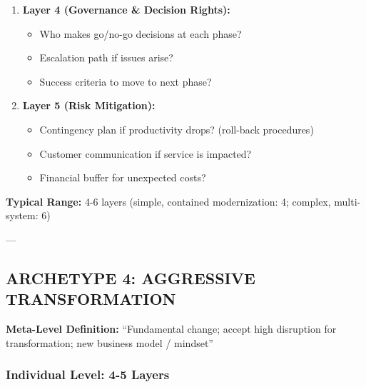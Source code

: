 \documentclass[11pt, a4paper]{article}
\begin{document}
\begin{tcolorbox}[colback=gray!5!white, colframe=gray!75!black, title=Example: Digital Modernization (Incremental Implementation)]
\begin{enumerate}
    \item \textbf{Layer 4 (Governance \& Decision Rights):}
    \begin{itemize}[nosep]
        \item Who makes go/no-go decisions at each phase?
        \item Escalation path if issues arise?
        \item Success criteria to move to next phase?
    \end{itemize}

    \item \textbf{Layer 5 (Risk Mitigation):}
    \begin{itemize}[nosep]
        \item Contingency plan if productivity drops? (roll-back procedures)
        \item Customer communication if service is impacted?
        \item Financial buffer for unexpected costs?
    \end{itemize}
\end{enumerate}

\textbf{Typical Range:} 4-6 layers (simple, contained modernization: 4; complex, multi-system: 6)

\end{tcolorbox}

---

\subsection{ARCHETYPE 4: AGGRESSIVE TRANSFORMATION}

\textbf{Meta-Level Definition:} ``Fundamental change; accept high disruption for transformation; new business model / mindset''

\subsubsection{Individual Level: 4-5 Layers}
\end{document}
